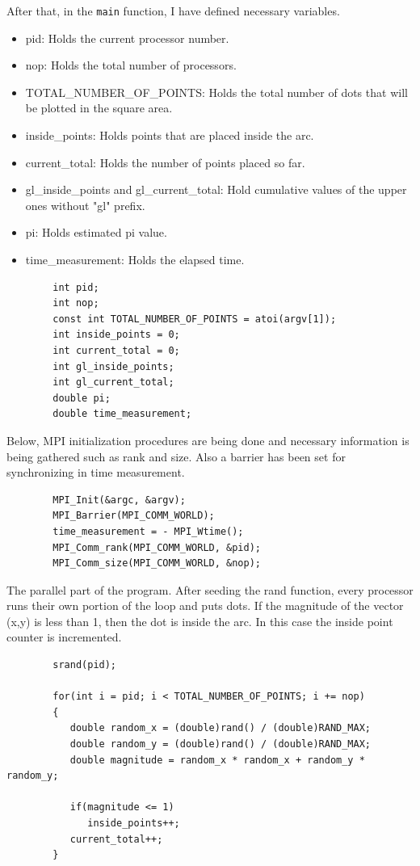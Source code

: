 \documentclass[12pt,a4paper]{article}
\begin{document}
        After that, in the \texttt{main} function, I have defined necessary variables.
        \begin{itemize}
            \item pid: Holds the current processor number.
            \item nop: Holds the total number of processors.
            \item TOTAL\_NUMBER\_OF\_POINTS: Holds the total number of dots that will be plotted in the square area.
            \item inside\_points: Holds points that are placed inside the arc.
            \item current\_total: Holds the number of points placed so far.
            \item gl\_inside\_points and gl\_current\_total: Hold cumulative values of the upper ones without "gl" prefix.
            \item pi: Holds estimated pi value.
            \item time\_measurement: Holds the elapsed time.
        \end{itemize}
        \begin{lstlisting}
        int pid;
        int nop;
        const int TOTAL_NUMBER_OF_POINTS = atoi(argv[1]);
        int inside_points = 0;
        int current_total = 0;
        int gl_inside_points;
        int gl_current_total;
        double pi;
        double time_measurement;
        \end{lstlisting}

        Below, MPI initialization procedures are being done and necessary information is being gathered such as rank and size.
        Also a barrier has been set for synchronizing in time measurement.
        \begin{lstlisting}
        MPI_Init(&argc, &argv);
        MPI_Barrier(MPI_COMM_WORLD);
        time_measurement = - MPI_Wtime();
        MPI_Comm_rank(MPI_COMM_WORLD, &pid);
        MPI_Comm_size(MPI_COMM_WORLD, &nop);
        \end{lstlisting}

        The parallel part of the program. After seeding the rand function, every processor runs their own portion of the loop and puts dots.
        If the magnitude of the vector (x,y) is less than 1, then the dot is inside the arc. In this case the inside point counter is incremented.
        \begin{lstlisting}
        srand(pid);
     
        for(int i = pid; i < TOTAL_NUMBER_OF_POINTS; i += nop)
        {
           double random_x = (double)rand() / (double)RAND_MAX;
           double random_y = (double)rand() / (double)RAND_MAX;
           double magnitude = random_x * random_x + random_y * random_y;
     
           if(magnitude <= 1)
              inside_points++;
           current_total++;
        }
        \end{lstlisting}
\end{document}
